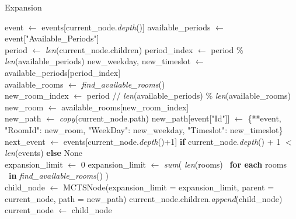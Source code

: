 \begin{algorithm}
\caption{Expansion}\label{expansion}
\begin{algorithmic}[1]
    \State event $\gets$ events[current\_node.\textit{depth}()]
    \State available\_periods $\gets$ event["Available\_Periods"]
    \\
    \State period $\gets$ \textit{len}(current\_node.children)
    \State period\_index $\gets$ period \% \textit{len}(available\_periods)
    \State new\_weekday, new\_timeslot $\gets$ available\_periods[period\_index]
    \\
    \State available\_rooms $\gets$ \textit{find\_available\_rooms}()
    \\
    \State new\_room\_index $\gets$ period // \textit{len}(available\_periods) \% \textit{len}(available\_rooms)
    \State new\_room $\gets$ available\_rooms[new\_room\_index]
    \\
    \State new\_path $\gets$ \textit{copy}(current\_node.path)
    \State new\_path[event["Id"]] $\gets$ \{**event, "RoomId": new\_room, "WeekDay": new\_weekday, "Timeslot": new\_timeslot\}
    \\
    \State next\_event $\gets$ events[current\_node.\textit{depth}()+1] \textbf{if} current\_node.\textit{depth}() + 1 $<$ \textit{len}(events) \textbf{else} None
    \\
         \State expansion\_limit $\gets$ 0
    \Else
         \State expansion\_limit $\gets$ \textit{sum}\big( \textit{len}(rooms) \ \textbf{for each} rooms \ \textbf{in} \textit{find\_available\_rooms}() \big)
    \EndIf
    \\
    \State child\_node $\gets$ MCTSNode(expansion\_limit = expansion\_limit, parent = current\_node, path = new\_path)
    \State current\_node.children.\textit{append}(child\_node)
    \State current\_node $\gets$ child\_node
\EndProcedure
\end{algorithmic}
\end{algorithm}



